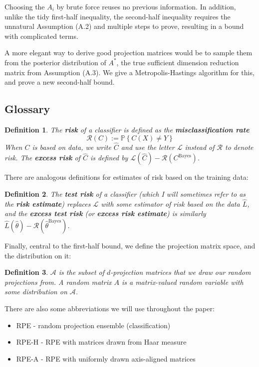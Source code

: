 \documentclass[ejs,preprint]{imsart}
\newtheorem{definition}{Definition}
\newcommand\risk{\mathcal{L}}
\newcommand\rrisk{\mathcal{R}}
\begin{document}
Choosing the $A_i$ by brute force reuses no previous information. In addition, unlike the tidy first-half inequality, the second-half inequality requires the unnatural Assumption (A.2) and multiple steps to prove, resulting in a bound with complicated terms.

A more elegant way to derive good projection matrices would be to sample them from the posterior distribution of $A^*$, the true sufficient dimension reduction matrix from Assumption (A.3). We give a Metropolis-Hastings algorithm for this, and prove a new second-half bound.

\subsection{Glossary}\label{sec:glossary}
\begin{definition}
The \textbf{risk} of a classifier is defined as the \textbf{misclassification
rate} 
\[
\rrisk(C):=\mathbb{P}\left\{ C(X)\neq Y\right\} 
\]
When $C$ is based on data, we write $\hat{C}$ and use the letter
$\risk$ instead of $\rrisk$ to denote risk. The \textbf{excess risk}
of $\hat{C}$ is defined by $\risk(\hat{C})-\rrisk(C^{\mathrm{Bayes}})$.
\end{definition}
There are analogous definitions for estimates of risk based on the
training data:
\begin{definition}
The \textbf{test risk} of a classifier (which I will sometimes refer
to as the \textbf{risk estimate}) replaces $\risk$ with some estimator
of risk based on the data $\hat{L}$, and the \textbf{excess test
risk} (or \textbf{excess risk estimate}) is similarly $\hat{L}(\hat{\theta})-\rrisk(\hat{\theta}^{\mathrm{Bayes}})$.
\end{definition}
Finally, central to the first-half bound, we define the projection matrix space,
and the distribution on it:
\begin{definition}
$\mathcal{A}$ is the subset of $d$-projection matrices that we draw
our random projections from. A random matrix $A$ is a matrix-valued
random variable with some distribution on $\mathcal{A}$.
\end{definition}

There are also some abbreviations we will use throughout the paper:
\begin{itemize}
\item RPE - random projection ensemble (classification)
\item RPE-H - RPE with matrices drawn from Haar measure
\item RPE-A - RPE with uniformly drawn axis-aligned matrices
\end{itemize}
\end{document}
